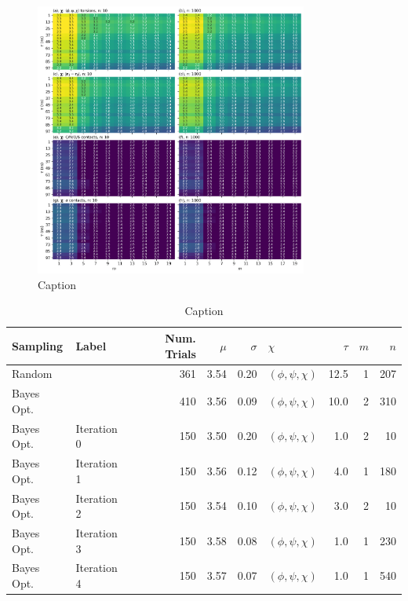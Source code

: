 \begin{figure}[ht]
    \centering
    \includegraphics[width=0.8\textwidth]{chapters/msm_optimization/figures/aadh_response_surface_d.png}
    \caption{Caption}
    \label{fig:aadh_rsm}
\end{figure}

\begin{table}
    \centering
    \begin{tabular}{|l|l|r|r|r|l|r|r|r|}
    \hline
       Sampling &        Label &  Num. Trials & $\mu$ & $\sigma$ &                $\chi$ & $\tau$ & $m$ & $n$ \\
    \hline\hline
         Random &              &          361 &  3.54 &     0.20 &  $(\phi, \psi, \chi)$ &   12.5 &   1 & 207 \\
     Bayes Opt. &              &          410 &  3.56 &     0.09 &  $(\phi, \psi, \chi)$ &   10.0 &   2 & 310 \\
     Bayes Opt. &  Iteration 0 &          150 &  3.50 &     0.20 &  $(\phi, \psi, \chi)$ &    1.0 &   2 &  10 \\
     Bayes Opt. &  Iteration 1 &          150 &  3.56 &     0.12 &  $(\phi, \psi, \chi)$ &    4.0 &   1 & 180 \\
     Bayes Opt. &  Iteration 2 &          150 &  3.54 &     0.10 &  $(\phi, \psi, \chi)$ &    3.0 &   2 &  10 \\
     Bayes Opt. &  Iteration 3 &          150 &  3.58 &     0.08 &  $(\phi, \psi, \chi)$ &    1.0 &   1 & 230 \\
     Bayes Opt. &  Iteration 4 &          150 &  3.57 &     0.07 &  $(\phi, \psi, \chi)$ &    1.0 &   1 & 540 \\
    \hline
    \end{tabular}
    \caption{Caption}
    \label{tab:my_label}
\end{table}


